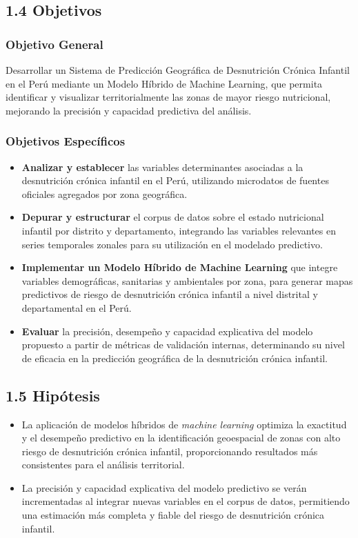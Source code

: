 \documentclass[
]{report}
\begin{document}
\subsection{1.4 Objetivos}\label{objetivos}

\subsubsection*{Objetivo General}

Desarrollar un Sistema de Predicción Geográfica de Desnutrición Crónica Infantil en el Perú mediante un Modelo Híbrido de Machine Learning, que permita identificar y visualizar territorialmente las zonas de mayor riesgo nutricional, mejorando la precisión y capacidad predictiva del análisis.

\subsubsection*{Objetivos Específicos}

\begin{itemize}
\item
  \textbf{Analizar y establecer} las variables determinantes asociadas a
  la desnutrición crónica infantil en el Perú, utilizando microdatos de
  fuentes oficiales agregados por zona geográfica.
\item
  \textbf{Depurar y estructurar} el corpus de datos sobre el estado
  nutricional infantil por distrito y departamento, integrando las
  variables relevantes en series temporales zonales para su utilización
  en el modelado predictivo.
\item
  \textbf{Implementar un Modelo Híbrido de Machine Learning} que integre
  variables demográficas, sanitarias y ambientales por zona, para
  generar mapas predictivos de riesgo de desnutrición crónica infantil a
  nivel distrital y departamental en el Perú.
\item
  \textbf{Evaluar} la precisión, desempeño y capacidad explicativa del
  modelo propuesto a partir de métricas de validación internas,
  determinando su nivel de eficacia en la predicción geográfica de la
  desnutrición crónica infantil.
\end{itemize}

\hypertarget{hipuxf3tesis}{%
\subsection{1.5 Hipótesis}\label{hipuxf3tesis}}

\begin{itemize}
\item
  La aplicación de modelos híbridos de \emph{machine learning} optimiza
  la exactitud y el desempeño predictivo en la identificación
  geoespacial de zonas con alto riesgo de desnutrición crónica infantil,
  proporcionando resultados más consistentes para el análisis
  territorial.
\item
  La precisión y capacidad explicativa del modelo predictivo se verán
  incrementadas al integrar nuevas variables en el corpus de datos,
  permitiendo una estimación más completa y fiable del riesgo de
  desnutrición crónica infantil.
\end{itemize}
\end{document}
